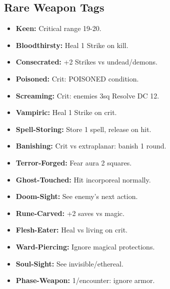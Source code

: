 \documentclass[10pt,twoside]{article}
\begin{document}
\subsection{Rare Weapon Tags}
\begin{minipage}[t]{0.48\textwidth}
\begin{itemize}[leftmargin=0.3cm, itemsep=0.1cm]
\item \textcolor{rarecolor}{\textbf{Keen:}} \textcolor{rarecolor}{Critical range 19-20.}
\item \textcolor{rarecolor}{\textbf{Bloodthirsty:}} \textcolor{rarecolor}{Heal 1 Strike on kill.}
\item \textcolor{rarecolor}{\textbf{Consecrated:}} \textcolor{rarecolor}{+2 Strikes vs undead/demons.}
\item \textcolor{rarecolor}{\textbf{Poisoned:}} \textcolor{rarecolor}{Crit: POISONED condition.}
\item \textcolor{rarecolor}{\textbf{Screaming:}} \textcolor{rarecolor}{Crit: enemies 3sq Resolve DC 12.}
\item \textcolor{rarecolor}{\textbf{Vampiric:}} \textcolor{rarecolor}{Heal 1 Strike on crit.}
\item \textcolor{rarecolor}{\textbf{Spell-Storing:}} \textcolor{rarecolor}{Store 1 spell, release on hit.}
\item \textcolor{rarecolor}{\textbf{Banishing:}} \textcolor{rarecolor}{Crit vs extraplanar: banish 1 round.}
\item \textcolor{rarecolor}{\textbf{Terror-Forged:}} \textcolor{rarecolor}{Fear aura 2 squares.}
\item \textcolor{rarecolor}{\textbf{Ghost-Touched:}} \textcolor{rarecolor}{Hit incorporeal normally.}
\item \textcolor{rarecolor}{\textbf{Doom-Sight:}} \textcolor{rarecolor}{See enemy's next action.}
\item \textcolor{rarecolor}{\textbf{Rune-Carved:}} \textcolor{rarecolor}{+2 saves vs magic.}
\item \textcolor{rarecolor}{\textbf{Flesh-Eater:}} \textcolor{rarecolor}{Heal vs living on crit.}
\item \textcolor{rarecolor}{\textbf{Ward-Piercing:}} \textcolor{rarecolor}{Ignore magical protections.}
\item \textcolor{rarecolor}{\textbf{Soul-Sight:}} \textcolor{rarecolor}{See invisible/ethereal.}
\item \textcolor{rarecolor}{\textbf{Phase-Weapon:}} \textcolor{rarecolor}{1/encounter: ignore armor.}
\end{itemize}
\end{minipage}
\end{document}
